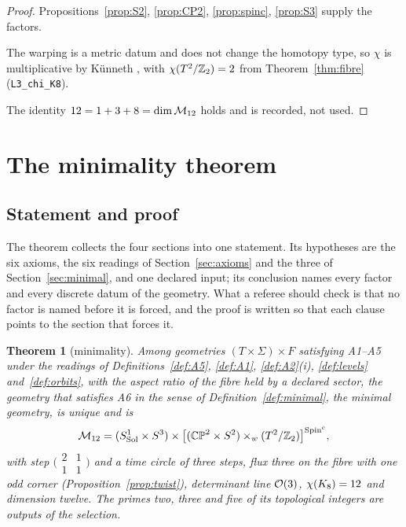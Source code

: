 \documentclass[11pt,a4paper]{article}
\theoremstyle{plain}
\newtheorem{theorem}{Theorem}[section]
\theoremstyle{definition}
\theoremstyle{remark}
\newcommand{\Sol}{\mathrm{Sol}}
\begin{document}
\begin{proof}
Propositions~\ref{prop:S2}, \ref{prop:CP2}, \ref{prop:spinc}, \ref{prop:S3} supply the factors.

The warping is a metric datum and does not change the homotopy type, so $\chi$ is multiplicative by K\"unneth \cite{Hatcher}, with $\chi(T^2/\mathbb{Z}_2)=2$ from Theorem~\ref{thm:fibre} (\texttt{L3\_chi\_K8}).

The identity $12=1+3+8=\dim\mathcal{M}_{12}$ holds and is recorded, not used.
\end{proof}

\section{The minimality theorem}\label{sec:theorem}

\subsection{Statement and proof}

The theorem collects the four sections into one statement. Its hypotheses are the six axioms, the six readings of Section~\ref{sec:axioms} and the three of Section~\ref{sec:minimal}, and one declared input; its conclusion names every factor and every discrete datum of the geometry. What a referee should check is that no factor is named before it is forced, and the proof is written so that each clause points to the section that forces it.

\begin{theorem}[minimality]\label{thm:main}
Among geometries $(T\times\Sigma)\times F$ satisfying A1--A5 under the readings of Definitions~\ref{def:A5}, \ref{def:A1}, \ref{def:A2}(i), \ref{def:levels} and~\ref{def:orbits}, with the aspect ratio of the fibre held by a declared sector, the geometry that satisfies A6 in the sense of Definition~\ref{def:minimal}, the minimal geometry, is unique and is
\[
\Mtwelve=(S^{1}_{\Sol}\times S^{3})\times\bigl[(\CPtwo\times\Stwo)\times_{w}(\Ttwo/\Ztwo)\bigr]^{\Spinc},
\]
with step $\bigl(\begin{smallmatrix}2&1\\1&1\end{smallmatrix}\bigr)$ and a time circle of three steps, flux three on the fibre with one odd corner (Proposition~\ref{prop:twist}), determinant line $\mathcal{O}(3)$, $\chi(K_8)=12$ and dimension twelve. The primes two, three and five of its topological integers are outputs of the selection.
\end{theorem}
\end{document}
